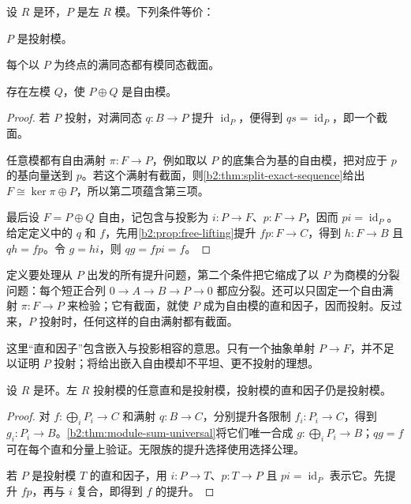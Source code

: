 \begin{theorem}\label{b2:thm:projective-characterizations}
	设 \(R\) 是环，\(P\) 是左 \(R\) 模。下列条件等价：
	\begin{equivalences}
		\item\label{b2:item:projective-lifting} \(P\) 是投射模。
		\item\label{b2:item:projective-split-epimorphism} 每个以 \(P\) 为终点的满同态都有模同态截面。
		\item\label{b2:item:projective-summand} 存在左模 \(Q\)，使 \(P\oplus Q\) 是自由模。
	\end{equivalences}
\end{theorem}
\begin{proof}
	若 \(P\) 投射，对满同态 \(q:B\to P\) 提升 \(\operatorname{id}_P\)，便得到 \(qs=\operatorname{id}_P\)，即一个截面。

	任意模都有自由满射 \(\pi:F\to P\)，例如取以 \(P\) 的底集合为基的自由模，把对应于 \(p\) 的基向量送到 \(p\)。若这个满射有截面，则\cref{b2:thm:split-exact-sequence}给出 \(F\cong\ker\pi\oplus P\)，所以第二项蕴含第三项。

	最后设 \(F=P\oplus Q\) 自由，记包含与投影为 \(i:P\to F\)、\(p:F\to P\)，因而 \(pi=\operatorname{id}_P\)。给定定义中的 \(q\) 和 \(f\)，先用\cref{b2:prop:free-lifting}提升 \(fp:F\to C\)，得到 \(h:F\to B\) 且 \(qh=fp\)。令 \(g=hi\)，则 \(qg=fpi=f\)。
\end{proof}

定义要处理从 \(P\) 出发的所有提升问题，第二个条件把它缩成了以 \(P\) 为商模的分裂问题：每个短正合列 \(0\to A\to B\to P\to0\) 都应分裂。还可以只固定一个自由满射 \(\pi:F\to P\) 来检验；它有截面，就使 \(P\) 成为自由模的直和因子，因而投射。反过来，\(P\) 投射时，任何这样的自由满射都有截面。

\ProseParagraphBreak
这里“直和因子”包含嵌入与投影相容的意思。只有一个抽象单射 \(P\to F\)，并不足以证明 \(P\) 投射；将给出嵌入自由模却不平坦、更不投射的理想。

\begin{proposition}\label{b2:prop:projective-sums-summands}
	设 \(R\) 是环。左 \(R\) 投射模的任意直和是投射模，投射模的直和因子仍是投射模。
\end{proposition}
\begin{proof}
	对 \(f:\bigoplus_iP_i\to C\) 和满射 \(q:B\to C\)，分别提升各限制 \(f_i:P_i\to C\)，得到 \(g_i:P_i\to B\)。\cref{b2:thm:module-sum-universal}将它们唯一合成 \(g:\bigoplus_iP_i\to B\)；\(qg=f\) 可在每个直和分量上验证。无限族的提升选择使用选择公理。

	若 \(P\) 是投射模 \(T\) 的直和因子，用 \(i:P\to T\)、\(p:T\to P\) 且 \(pi=\operatorname{id}_P\) 表示它。先提升 \(fp\)，再与 \(i\) 复合，即得到 \(f\) 的提升。
\end{proof}

